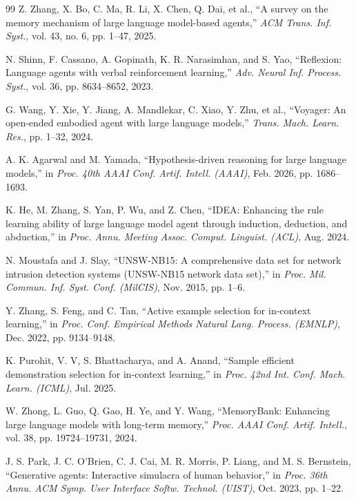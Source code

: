 \documentclass[11pt,letterpaper,onecolumn]{article}
\begin{document}
\begin{thebibliography}{99}
Z. Zhang, X. Bo, C. Ma, R. Li, X. Chen, Q. Dai, et al., ``A survey on the memory mechanism of large language model-based agents,'' \emph{ACM Trans. Inf. Syst.}, vol. 43, no. 6, pp. 1--47, 2025.

N. Shinn, F. Cassano, A. Gopinath, K. R. Narasimhan, and S. Yao, ``Reflexion: Language agents with verbal reinforcement learning,'' \emph{Adv. Neural Inf. Process. Syst.}, vol. 36, pp. 8634--8652, 2023.

G. Wang, Y. Xie, Y. Jiang, A. Mandlekar, C. Xiao, Y. Zhu, et al., ``Voyager: An open-ended embodied agent with large language models,'' \emph{Trans. Mach. Learn. Res.}, pp. 1--32, 2024.

A. K. Agarwal and M. Yamada, ``Hypothesis-driven reasoning for large language models,'' in \emph{Proc. 40th AAAI Conf. Artif. Intell. (AAAI)}, Feb. 2026, pp. 1686--1693.

K. He, M. Zhang, S. Yan, P. Wu, and Z. Chen, ``IDEA: Enhancing the rule learning ability of large language model agent through induction, deduction, and abduction,'' in \emph{Proc. Annu. Meeting Assoc. Comput. Linguist. (ACL)}, Aug. 2024.

N. Moustafa and J. Slay, ``UNSW-NB15: A comprehensive data set for network intrusion detection systems (UNSW-NB15 network data set),'' in \emph{Proc. Mil. Commun. Inf. Syst. Conf. (MilCIS)}, Nov. 2015, pp. 1--6.

Y. Zhang, S. Feng, and C. Tan, ``Active example selection for in-context learning,'' in \emph{Proc. Conf. Empirical Methods Natural Lang. Process. (EMNLP)}, Dec. 2022, pp. 9134--9148.

K. Purohit, V. V, S. Bhattacharya, and A. Anand, ``Sample efficient demonstration selection for in-context learning,'' in \emph{Proc. 42nd Int. Conf. Mach. Learn. (ICML)}, Jul. 2025.

W. Zhong, L. Guo, Q. Gao, H. Ye, and Y. Wang, ``MemoryBank: Enhancing large language models with long-term memory,'' \emph{Proc. AAAI Conf. Artif. Intell.}, vol. 38, pp. 19724--19731, 2024.

J. S. Park, J. C. O'Brien, C. J. Cai, M. R. Morris, P. Liang, and M. S. Bernstein, ``Generative agents: Interactive simulacra of human behavior,'' in \emph{Proc. 36th Annu. ACM Symp. User Interface Softw. Technol. (UIST)}, Oct. 2023, pp. 1--22.


\end{thebibliography}
\end{document}
